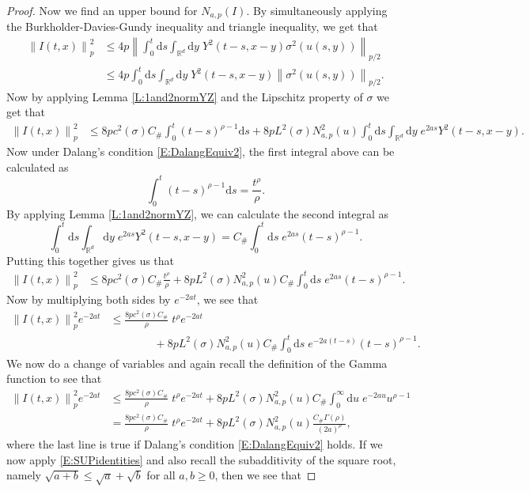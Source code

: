 \documentclass[12pt]{report}
\theoremstyle{plain}
\theoremstyle{definition}
\numberwithin{equation}{section}
\newcommand{\R}{\mathbb{R}}
\newcommand{\Norm}[1]{\left\|  #1   \right\|}
\newcommand{\ud}{\ensuremath{ \mathrm{d} }}
\begin{document}
\begin{proof}
	Now we find an upper bound for $N_{a,p}(I)$. By simultaneously applying the Burkholder-Davies-Gundy inequality and triangle inequality, we get that  
	\begin{align*}
	\Norm{I(t,x)}_p^2 &\le 4p \Norm{\int_0^t \ud s \int_{\R^d}\ud y \; Y^2(t-s,x-y)\sigma^2(u(s,y))  }_{p/2}
	\\&\le 4p \int_0^t \ud s \int_{\R^d} \ud y \; Y^2(t-s,x-y)\Norm{\sigma^2(u(s,y))}_{p/2}.
	\end{align*}
	Now by applying Lemma \ref{L:1and2normYZ} and the Lipschitz property of $\sigma$ we get that 
	\begin{align*}
	\Norm{I(t,x)}_p^2 &\le 8pc^2(\sigma)C_{\#}\int_0^t (t-s)^{\rho -1} \ud s + 8pL^2(\sigma)N^2_{a,p}(u)\int_0^t \ud s \int_{\R^d} \ud y \; e^{2as} Y^2(t-s,x-y).
	\end{align*} 
	Now under Dalang's condition \eqref{E:DalangEquiv2}, the first integral above can be calculated as 
	\[
	\int_0^t (t-s)^{\rho -1} \ud s = \frac{ t^{\rho} }{\rho}.
	\]
	By applying Lemma \ref{L:1and2normYZ}, we can calculate the second integral as 
	\[
	\int_0^t \ud s \int_{\R^d} \ud y \; e^{2as} Y^2(t-s,x-y) = C_{\#}\int_0^t \ud s \; e^{2as}(t-s)^{\rho - 1}.
	\]
	Putting this together gives us that 
	\begin{align*}
	\Norm{I(t,x)}_p^2 &\le 8pc^2(\sigma)C_{\#} \frac{ t^{\rho} }{\rho} + 8pL^2(\sigma)N^2_{a,p}(u) C_{\#}\int_0^t \ud s \; e^{2as}(t-s)^{\rho - 1}.
	\end{align*}
	Now by multiplying both sides by $e^{-2at}$, we see that
	\begin{align*}
	\Norm{I(t,x)}_p^2e^{-2at} &\le \frac{8pc^2(\sigma)C_{\#} }{\rho} \; t^{\rho} e^{-2at} 
	\\&\qquad\qquad + 8pL^2(\sigma)N^2_{a,p}(u) C_{\#} \int_0^t \ud s \; e^{-2a(t-s)}(t-s)^{\rho - 1}.
	\end{align*}
	We now do a change of variables and again recall the definition of the Gamma function to see that 
	\begin{align*}
	\Norm{I(t,x)}_p^2e^{-2at}  &\le \frac{8pc^2(\sigma)C_{\#} }{\rho} \; t^{\rho} e^{-2at} + 8pL^2(\sigma)N^2_{a,p}(u) C_{\#} \int_0^\infty \ud u \; e^{-2au} u^{\rho -1} \\
	& = \frac{8pc^2(\sigma)C_{\#} }{\rho} \; t^{\rho} e^{-2at} + 8pL^2(\sigma)N^2_{a,p}(u) \frac{C_{\#}\Gamma\left(\rho \right)}{ (2a)^{\rho}},
	\end{align*}
	where the last line is true if Dalang's condition \eqref{E:DalangEquiv2} holds. If we now apply \eqref{E:SUPidentities} and also recall the subadditivity of the square root, namely $\sqrt{a+b} \le \sqrt{a} + \sqrt{b}$ for all $a,b \ge 0$, then we see that 

\end{proof}
\end{document}
